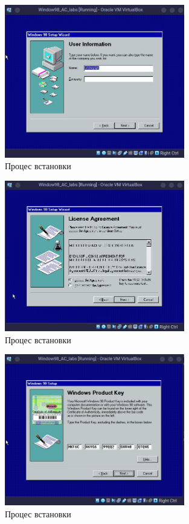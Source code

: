 \begin{figure}[h]
    \centering
    \includegraphics[width=0.7\textwidth]{reports/AC/lab1/assets/16.jpeg}
    \caption{Процес встановки}
\end{figure}

\begin{figure}[h]
    \centering
    \includegraphics[width=0.7\textwidth]{reports/AC/lab1/assets/17.jpeg}
    \caption{Процес встановки}
\end{figure}

\begin{figure}[h]
    \centering
    \includegraphics[width=0.7\textwidth]{reports/AC/lab1/assets/18.jpeg}
    \caption{Процес встановки}
\end{figure}

